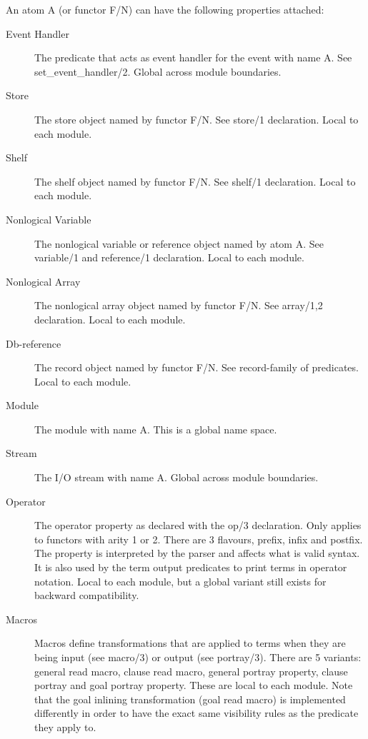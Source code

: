 An atom A (or functor F/N) can have the following properties attached:
\begin{description}
\item[Event Handler] The predicate that acts as event handler for the event
        with name A.  See set_event_handler/2. Global across module boundaries.
\item[Store] The store object named by functor F/N. See store/1 declaration.
        Local to each module.
\item[Shelf] The shelf object named by functor F/N. See shelf/1 declaration.
        Local to each module.
\item[Nonlogical Variable] The nonlogical variable or reference
        object named by atom A. See variable/1 and reference/1 declaration.
        Local to each module.
\item[Nonlogical Array] The nonlogical array object named by functor F/N.
        See array/1,2 declaration.  Local to each module.
\item[Db-reference] The record object named by functor F/N.
        See record-family of predicates.  Local to each module.
\item[Module] The module with name A. This is a global name space.
\item[Stream] The I/O stream with name A. Global across module boundaries.
\item[Operator] The operator property as declared with the op/3 declaration.
        Only applies to functors with arity 1 or 2. There are 3 flavours,
        prefix, infix and postfix. The property is interpreted by the parser
        and affects what is valid syntax. It is also used by the term output
        predicates to print terms in operator notation.
        Local to each module, but a global variant still exists for backward
        compatibility.
\item[Macros] Macros define transformations that are applied to terms when
        they are being input (see macro/3) or output (see portray/3).
        There are 5 variants: general read macro, clause read macro, general 
        portray property, clause portray and goal portray property.
        These are local to each module.
        Note that the goal inlining transformation (goal read macro) is
        implemented differently in order to have the exact same visibility
        rules as the predicate they apply to.
\end{description}


